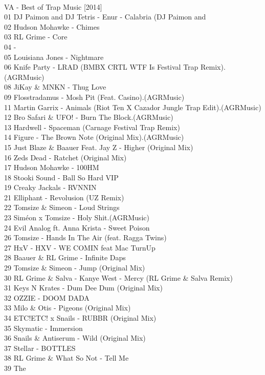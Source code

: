 \begin{multicols}{2}
\\ \large VA - Best of Trap Music [2014] \normalsize\\
 01 DJ Paimon and DJ Tetris - Enur - Calabria (DJ Paimon and\\ 02 Hudson Mohawke - Chimes\\ 03 RL Grime - Core\\ 04  - \\ 05 Louisiana Jones - Nightmare\\ 06 Knife Party - LRAD (BMBX CRTL WTF Is Festival Trap Remix).(AGRMusic)\\ 08 JiKay \& MNKN - Thug Love\\ 09 Flosstradamus - Mosh Pit (Feat. Casino).(AGRMusic)\\ 11 Martin Garrix - Animals (Riot Ten X Cazador Jungle Trap Edit).(AGRMusic)\\ 12 Bro Safari \& UFO! - Burn The Block.(AGRMusic)\\ 13 Hardwell - Spaceman (Carnage Festival Trap Remix)\\ 14 Figure - The Brown Note (Original Mix).(AGRMusic)\\ 15 Just Blaze \& Baauer Feat. Jay Z - Higher (Original Mix)\\ 16 Zeds Dead - Ratchet (Original Mix)\\ 17 Hudson Mohawke - 100HM\\ 18 Stooki Sound - Ball So Hard VIP\\ 19 Creaky Jackals - RVNNIN \\ 21 Elliphant - Revolusion (UZ Remix)\\ 22 Tomsize \& Simeon - Loud Strings\\ 23 Siméon x Tomsize - Holy Shit.(AGRMusic)\\ 24 Evil Analog ft. Anna Krista - Sweet Poison\\ 26 Tomsize - Hands In The Air (feat. Ragga Twins)\\ 27 HxV - HXV - WE COMIN feat Mac TurnUp\\ 28 Baauer \& RL Grime - Infinite Daps\\ 29 Tomsize \& Simeon - Jump (Original Mix)\\ 30 RL Grime \& Salva - Kanye West - Mercy (RL Grime \& Salva Remix)\\ 31 Keys N Krates - Dum Dee Dum (Original Mix)\\ 32 OZZIE - DOOM DADA\\ 33 Milo \& Otis - Pigeons (Original Mix)\\ 34 ETC!ETC! x Snails    - RUBBR (Original Mix) \\ 35 Skymatic - Immersion\\ 36 Snails \& Antiserum - Wild (Original Mix)\\ 37 Stellar - BOTTLES\\ 38 RL Grime \& What So Not - Tell Me\\ 39 The 
\end{multicols}
